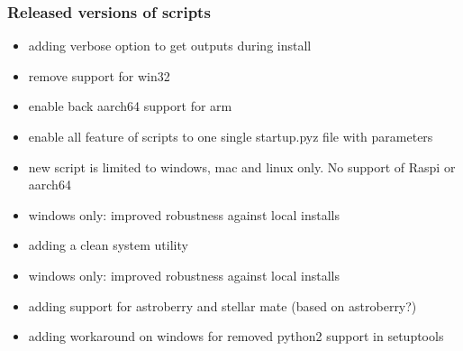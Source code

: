 \documentclass[a4paper,10pt,english]{sphinxmanual}
\begin{document}
\subsubsection{Released versions of scripts}
\label{\detokenize{changelog/changelogScripts:id1}}
\begin{itemize}
\item {} 
\sphinxAtStartPar
adding verbose option to get outputs during install

\end{itemize}

\begin{itemize}
\item {} 
\sphinxAtStartPar
remove support for win32

\end{itemize}

\begin{itemize}
\item {} 
\sphinxAtStartPar
enable back aarch64 support for arm

\end{itemize}

\begin{itemize}
\item {} 
\sphinxAtStartPar
enable all feature of scripts to one single startup.pyz file with parameters

\item {} 
\sphinxAtStartPar
new script is limited to windows, mac and linux only. No support of Raspi or
aarch64

\end{itemize}

\begin{itemize}
\item {} 
\sphinxAtStartPar
windows only: improved robustness against local installs

\item {} 
\sphinxAtStartPar
adding a clean system utility

\end{itemize}

\begin{itemize}
\item {} 
\sphinxAtStartPar
windows only: improved robustness against local installs

\end{itemize}

\begin{itemize}
\item {} 
\sphinxAtStartPar
adding support for astroberry and stellar mate (based on astroberry?)

\item {} 
\sphinxAtStartPar
adding workaround on windows for removed python2 support in setuptools

\end{itemize}
\end{document}
